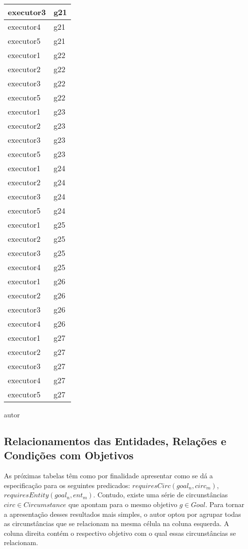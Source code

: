 \begin{center}
\begin{longtable}[H]{|l|l|}
executor3 & g21 \\ \hline
executor4 & g21 \\ \hline
executor5 & g21 \\ \hline
executor1 & g22 \\ \hline
executor2 & g22 \\ \hline
executor3 & g22 \\ \hline
executor5 & g22 \\ \hline
executor1 & g23 \\ \hline
executor2 & g23 \\ \hline
executor3 & g23 \\ \hline
executor5 & g23 \\ \hline
executor1 & g24 \\ \hline
executor2 & g24 \\ \hline
executor3 & g24 \\ \hline
executor5 & g24 \\ \hline
executor1 & g25 \\ \hline
executor2 & g25 \\ \hline
executor3 & g25 \\ \hline
executor4 & g25 \\ \hline
executor1 & g26 \\ \hline
executor2 & g26 \\ \hline
executor3 & g26 \\ \hline
executor4 & g26 \\ \hline
executor1 & g27 \\ \hline
executor2 & g27 \\ \hline
executor3 & g27 \\ \hline
executor4 & g27 \\ \hline
executor5 & g27 \\ \hline
\end{longtable}
autor
\end{center}

\subsection{Relacionamentos das Entidades, Relações e Condições com Objetivos}

As próximas tabelas têm como por finalidade apresentar como se dá a especificação para os seguintes predicados: $requiresCirc(goal_n, circ_m)$,$requiresEntity(goal_n, ent_m)$. Contudo, existe uma série de circunstâncias $circ \in Circumstance$ que apontam para o mesmo objetivo $g \in Goal$. Para tornar a apresentação desses resultados mais simples, o autor optou por agrupar todas as circunstâncias que se relacionam na mesma célula na coluna esquerda. A coluna direita contém o respectivo objetivo com o qual essas circunstâncias se relacionam.

